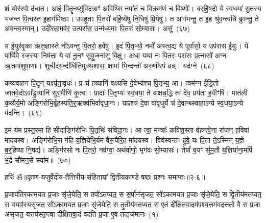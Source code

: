 शं योर॑र॒पो द॑धात। आहं पि॒तॄन्थ्सु॑वि॒दत्राꣳ॑ अविथ्सि॒ नपा॑तं च वि॒क्रम॑णं च॒ विष्णोः᳚। ब॒र्॒\mbox{}हि॒षदो॒ ये स्व॒धया॑ सु॒तस्य॒ भज॑न्त पि॒त्वस्त इ॒हाग॑मिष्ठाः। उप॑हूताः पि॒तरो॑ बर्\mbox{}हि॒ष्ये॑षु नि॒धिषु॑ प्रि॒येषु॑। त आग॑मन्तु॒ त इ॒ह श्रु॑व॒न्त्वधि॑ ब्रुवन्तु॒ ते अ॑वन्त्व॒स्मान्। उदी॑रता॒मव॑र॒ उत्परा॑स॒ उन्म॑ध्य॒माः पि॒तरः॑ सो॒म्यासः॑। असुं॒~(६७)

य ई॒युर॑वृ॒का ऋ॑त॒ज्ञास्ते नो॑\-ऽवन्तु पि॒तरो॒ हवे॑षु। इ॒दं पि॒तृभ्यो॒ नमो॑ अस्त्व॒द्य ये पूर्वा॑सो॒ य उप॑रास ई॒युः। ये पार्थि॑वे॒ रज॒स्या निष॑त्ता॒ ये वा॑ नू॒नꣳ सु॑वृ॒जना॑सु वि॒क्षु। अधा॒ यथा॑ नः पि॒तरः॒ परा॑सः प्र॒त्नासो॑ अग्न ऋ॒तमा॑शुषा॒णाः। शुचीद॑य॒न्दीधि॑तिमुक्थ॒शासः॒ क्षामा॑ भि॒न्दन्तो॑ अरु॒णीरप॑ व्रन्न्। यद॑ग्ने~(६८)

कव्यवाहन पि॒तॄन् यक्ष्यृ॑ता॒वृधः॑। प्र च॑ ह॒व्यानि॑ वक्ष्यसि दे॒वेभ्य॑श्च पि॒तृभ्य॒ आ। त्वम॑ग्न ईडि॒तो जा॑तवे॒दो\-ऽवा᳚ड्ढ॒व्यानि॑ सुर॒भीणि॑ कृ॒त्वा। प्रादाः᳚ पि॒तृभ्यः॑ स्व॒धया॒ ते अ॑क्षन्न॒द्धि त्वं दे॑व॒ प्रय॑ता ह॒वीꣳषि॑। मात॑ली क॒व्यैर्य॒मो अङ्गि॑रोभि॒र्बृह॒स्पति॒र्॒\mbox{}ऋक्व॑भिर्वावृधा॒नः। याꣴश्च॑ दे॒वा वा॑वृ॒धुर्ये च॑ दे॒वान्थ्\-स्वाहा॒\-ऽन्ये स्व॒धया॒\-ऽन्ये म॑दन्ति।~(६९)

इ॒मं य॑म प्रस्त॒रमा हि सीदाङ्गि॑रोभिः पि॒तृभिः॑ संविदा॒नः। आ त्वा॒ मन्त्राः᳚ कविश॒स्ता व॑हन्त्वे॒ना रा॑जन् ह॒विषा॑ मादयस्व। अङ्गि॑रोभि॒रा ग॑हि य॒ज्ञिये॑भि॒र्यम॑ वैरू॒पैरि॒ह मा॑दयस्व। विव॑स्वन्तꣳ हुवे॒ यः पि॒ता ते॒\-ऽस्मिन् य॒ज्ञे ब॒र्॒\mbox{}हिष्या नि॒षद्य॑। अङ्गि॑रसो नः पि॒तरो॒ नव॑ग्वा॒ अथ॑र्वाणो॒ भृग॑वः सो॒म्यासः॑। तेषां᳚ व॒यꣳ सु॑म॒तौ य॒ज्ञिया॑ना॒मपि॑ भ॒द्रे सौ॑मन॒से स्या॑म॥~(७०)

{\anuvakamend[{भ॒वा॒स्मभ्य॒मसुं॒ यद॑ग्ने मदन्ति सौमन॒स एक॑ञ्च}]}%

{हरिः॑ ॐ}{॥कृष्ण-यजुर्वेदीय-तैत्तिरीय-संहितायां द्वितीयकाण्डे षष्ठः प्रश्नः समाप्तः॥२-६॥}


\setcounter{anuvakam}{0}
प्र॒जा\-प॑तिरकामयत प्र॒जाः सृ॑जे॒येति॒ स तपो॑\-ऽतप्यत॒ स स॒र्पान॑सृजत॒ सो॑\-ऽकामयत प्र॒जाः सृ॑जे॒येति॒ स द्वि॒तीय॑म\-तप्यत॒ स वयाꣴ॑स्यसृजत॒ सो॑\-ऽकामयत प्र॒जाः सृ॑जे॒येति॒ स तृ॒तीय॑मतप्यत॒ स ए॒तं दी᳚क्षितवा॒दम॑पश्य॒त्तम॑वद॒त्ततो॒ वै स प्र॒जा अ॑सृजत॒ यत्तप॑स्त॒प्त्वा दी᳚क्षितवा॒दं वद॑ति प्र॒जा ए॒व तद्यज॑मानः~(१)

